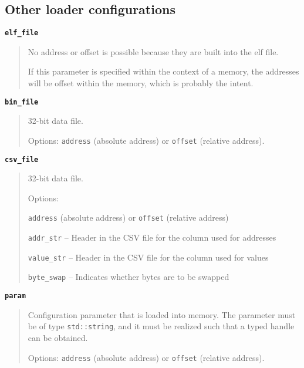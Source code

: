 \subsection{Other loader configurations}

{\textbf {\footnotesize{\lstinline!elf_file!}}}
\vspace{-2pt}
\begin{quote}
No address or offset is possible because they are built into the elf file.

If this parameter is specified within the context of a memory, the addresses will be offset within the memory, which is probably the intent.
\end{quote}

{\textbf {\footnotesize{\lstinline!bin_file!}}}
\vspace{-2pt}
\begin{quote}
32-bit data file.

Options: {\small{\lstinline!address!}} (absolute address) or {\small{\lstinline!offset!}} (relative address).
\end{quote}


{\textbf {\footnotesize{\lstinline!csv_file!}}}
\vspace{-2pt}
\begin{quote}
32-bit data file.

Options:
\begin{itemize1}
\item {\small{\lstinline!address!}} (absolute address) or {\small{\lstinline!offset!}} (relative address)
\item {\small{\lstinline!addr_str!}}  -- Header in the CSV file for the column used for addresses
\item {\small{\lstinline!value_str!}} -- Header in the CSV file for the column used for values
\item {\small{\lstinline!byte_swap!}} -- Indicates whether bytes are to be swapped
\end{itemize1}
\end{quote}


{\textbf {\footnotesize{\lstinline!param!}}}
\vspace{-2pt}
\begin{quote}
Configuration parameter that is loaded into memory. The parameter must be of type {\small{\lstinline!std::string!}}, and it must be realized such that a typed handle can be obtained.

Options: {\small{\lstinline!address!}} (absolute address) or {\small{\lstinline!offset!}} (relative address).
\end{quote}


